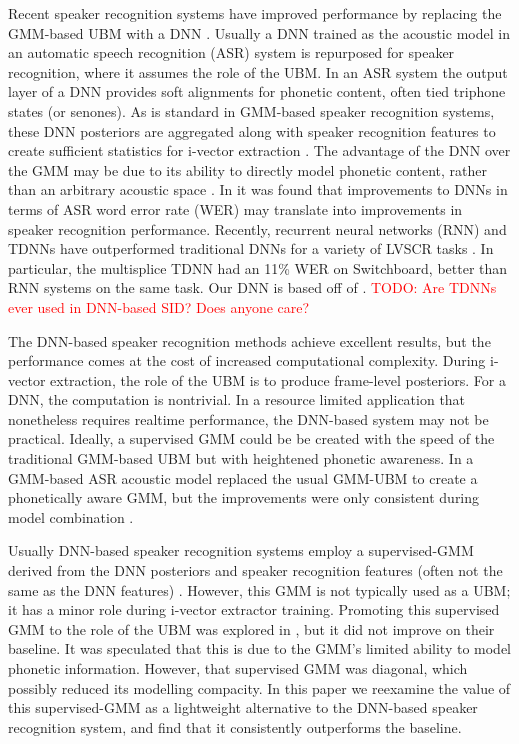 \documentclass{article}
\newcommand\davidnote[1]{\textcolor{red}{#1}}
\begin{document}
Recent speaker recognition systems have improved performance by replacing 
the GMM-based UBM with a DNN \cite{lei2014, garcia2014}. 
Usually a DNN trained as the acoustic model in
an automatic speech recognition (ASR) system is repurposed for
speaker recognition, where it assumes the role of the UBM.
In an ASR system the output layer of a DNN provides soft alignments for
phonetic content, often tied triphone states (or senones). As is standard 
in GMM-based speaker recognition systems, these DNN posteriors are aggregated
along with speaker recognition features to create sufficient statistics for
i-vector extraction \cite{ivector}. The advantage of the DNN over the GMM may
be due to its ability to directly model phonetic content, rather than an arbitrary
acoustic space \cite{lei2014, garcia2014}. In \cite{garcia2014} it was found that
improvements to DNNs in terms of ASR word error rate (WER) may translate into 
improvements in speaker
recognition performance. Recently, recurrent neural networks (RNN) and TDNNs \cite{tdnn} have
outperformed traditional DNNs for a variety of LVSCR tasks \cite{lstm, saon2014, multisplice}.
In particular, the multisplice TDNN \cite{multisplice} had an 11\% WER
on Switchboard, better than RNN systems on the same task. 
Our DNN is based off of \cite{multisplice}. \davidnote{TODO: Are TDNNs ever used in
DNN-based SID? Does anyone care?}

The DNN-based speaker recognition methods achieve excellent results, but the
performance comes at the cost of increased computational complexity. During
i-vector extraction, the role of the UBM is to produce frame-level posteriors.
For a DNN, the computation is nontrivial. In a resource limited application
that nonetheless requires realtime performance, the DNN-based system may
not be practical. Ideally, a supervised GMM could be be created with the 
speed of the traditional GMM-based UBM but with heightened phonetic awareness.
In \cite{omar2010} a GMM-based ASR acoustic model replaced the usual GMM-UBM
to create a phonetically aware GMM, but the improvements were only consistent
during model combination \cite{omar2010}.

Usually DNN-based speaker recognition systems employ a supervised-GMM
derived from the DNN posteriors and speaker recognition features (often
not the same as the DNN features) \cite{kenny2014deep, lei2014, garcia2014}.
However, this GMM is not typically
used as a UBM; it has a minor role during i-vector extractor training.
Promoting this supervised GMM to the role of the UBM was explored
in \cite{lei2014}, but it did not improve on their baseline.
It was speculated that this is due
to the GMM's limited ability to model phonetic information. However,
that supervised GMM was diagonal, which possibly
reduced its modelling compacity. In this paper we reexamine the 
value of this supervised-GMM as a lightweight alternative to the DNN-based
speaker recognition system, and find that it consistently outperforms the
baseline.
\end{document}
